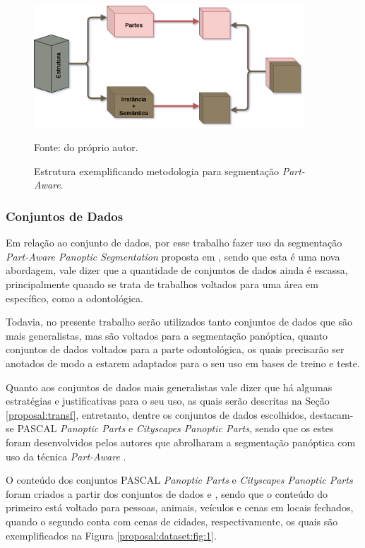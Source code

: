 \begin{figure}[H]
    \centering
    \caption{Estrutura exemplificando metodologia para segmentação \textit{Part-Aware}.}
    \includegraphics[width=4in]{recursos/imagens/proposal/estrutura.png}
    \label{proposal:method:fig:2}

    Fonte: do próprio autor.
\end{figure}


\subsubsection{Conjuntos de Dados}
\label{proposal:dataset}
Em relação ao conjunto de dados, por esse trabalho fazer uso da segmentação \textit{Part-Aware Panoptic Segmentation} proposta em \cite{DeGeus2021}, sendo que esta é uma nova abordagem, vale dizer que a quantidade de conjuntos de dados ainda é escassa, principalmente quando se trata de trabalhos voltados para uma área em específico, como a odontológica.

Todavia, no presente trabalho serão utilizados tanto conjuntos de dados que são mais generalistas, mas são voltados para a segmentação panóptica, quanto conjuntos de dados voltados para a parte odontológica, os quais precisarão ser anotados de modo a estarem adaptados para o seu uso em bases de treino e teste.

Quanto aos conjuntos de dados mais generalistas vale dizer que há algumas estratégias e justificativas para o seu uso, as quais serão descritas na Seção \ref{proposal:transf}, entretanto, dentre os conjuntos de dados escolhidos, destacam-se PASCAL \textit{Panoptic Parts} e \textit{Cityscapes Panoptic Parts}, sendo que os estes foram desenvolvidos pelos autores que abrolharam a segmentação panóptica com uso da técnica \textit{Part-Aware} \cite{DeGeus2021}.

O conteúdo dos conjuntos PASCAL \textit{Panoptic Parts} e \textit{Cityscapes Panoptic Parts} foram criados a partir dos conjuntos de dados \cite{everingham2010pascal} e \cite{Cordts2016}, sendo que o conteúdo do primeiro está voltado para pessoas, animais, veículos e cenas em locais fechados, quando o segundo conta com cenas de cidades, respectivamente, os quais são exemplificados na Figura \ref{proposal:dataset:fig:1}.

